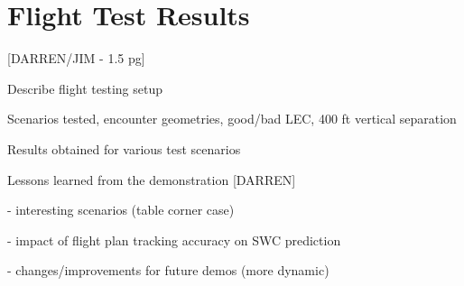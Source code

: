 \section{Flight Test Results}

[DARREN/JIM - 1.5 pg]

Describe flight testing setup

Scenarios tested, encounter geometries, good/bad LEC, 400 ft vertical separation

Results obtained for various test scenarios

Lessons learned from the demonstration [DARREN]

- interesting scenarios (table corner case)

- impact of flight plan tracking accuracy on SWC prediction

- changes/improvements for future demos (more dynamic)

